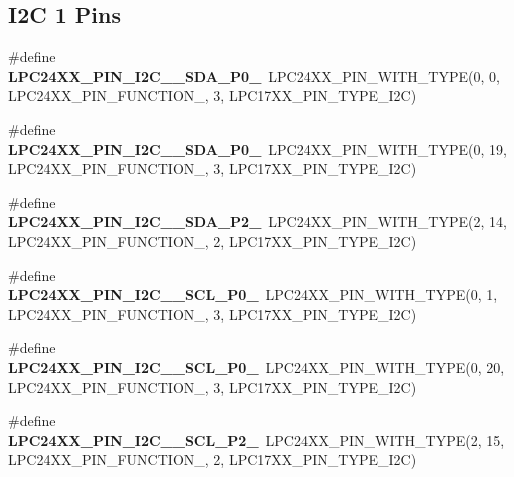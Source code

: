 \subsection*{I2C 1 Pins}
\begin{DoxyCompactItemize}
\item 
\mbox{\label{group__lpc24xx__io_ga3a047463a31dc3b28af1c553489df8ba}} 
\#define {\bfseries L\+P\+C24\+X\+X\+\_\+\+P\+I\+N\+\_\+\+I2\+C\+\_\+\_\+\+S\+D\+A\+\_\+\+P0\+\_}~L\+P\+C24\+X\+X\+\_\+\+P\+I\+N\+\_\+\+W\+I\+T\+H\+\_\+\+T\+Y\+PE(0, 0, L\+P\+C24\+X\+X\+\_\+\+P\+I\+N\+\_\+\+F\+U\+N\+C\+T\+I\+O\+N\+\_, 3, L\+P\+C17\+X\+X\+\_\+\+P\+I\+N\+\_\+\+T\+Y\+P\+E\+\_\+\+I2C)
\item 
\mbox{\label{group__lpc24xx__io_ga5ffb0adee0da470fdbfcc0ff00e24a79}} 
\#define {\bfseries L\+P\+C24\+X\+X\+\_\+\+P\+I\+N\+\_\+\+I2\+C\+\_\+\_\+\+S\+D\+A\+\_\+\+P0\+\_}~L\+P\+C24\+X\+X\+\_\+\+P\+I\+N\+\_\+\+W\+I\+T\+H\+\_\+\+T\+Y\+PE(0, 19, L\+P\+C24\+X\+X\+\_\+\+P\+I\+N\+\_\+\+F\+U\+N\+C\+T\+I\+O\+N\+\_, 3, L\+P\+C17\+X\+X\+\_\+\+P\+I\+N\+\_\+\+T\+Y\+P\+E\+\_\+\+I2C)
\item 
\mbox{\label{group__lpc24xx__io_ga846f53f4234a4803f3daeb663ca194c6}} 
\#define {\bfseries L\+P\+C24\+X\+X\+\_\+\+P\+I\+N\+\_\+\+I2\+C\+\_\+\_\+\+S\+D\+A\+\_\+\+P2\+\_}~L\+P\+C24\+X\+X\+\_\+\+P\+I\+N\+\_\+\+W\+I\+T\+H\+\_\+\+T\+Y\+PE(2, 14, L\+P\+C24\+X\+X\+\_\+\+P\+I\+N\+\_\+\+F\+U\+N\+C\+T\+I\+O\+N\+\_, 2, L\+P\+C17\+X\+X\+\_\+\+P\+I\+N\+\_\+\+T\+Y\+P\+E\+\_\+\+I2C)
\item 
\mbox{\label{group__lpc24xx__io_ga1e5603d4ec0e2b0415b71dcb62b42e23}} 
\#define {\bfseries L\+P\+C24\+X\+X\+\_\+\+P\+I\+N\+\_\+\+I2\+C\+\_\+\_\+\+S\+C\+L\+\_\+\+P0\+\_}~L\+P\+C24\+X\+X\+\_\+\+P\+I\+N\+\_\+\+W\+I\+T\+H\+\_\+\+T\+Y\+PE(0, 1, L\+P\+C24\+X\+X\+\_\+\+P\+I\+N\+\_\+\+F\+U\+N\+C\+T\+I\+O\+N\+\_, 3, L\+P\+C17\+X\+X\+\_\+\+P\+I\+N\+\_\+\+T\+Y\+P\+E\+\_\+\+I2C)
\item 
\mbox{\label{group__lpc24xx__io_ga39bbd04bce48f75337e5fa0311eaf3eb}} 
\#define {\bfseries L\+P\+C24\+X\+X\+\_\+\+P\+I\+N\+\_\+\+I2\+C\+\_\+\_\+\+S\+C\+L\+\_\+\+P0\+\_}~L\+P\+C24\+X\+X\+\_\+\+P\+I\+N\+\_\+\+W\+I\+T\+H\+\_\+\+T\+Y\+PE(0, 20, L\+P\+C24\+X\+X\+\_\+\+P\+I\+N\+\_\+\+F\+U\+N\+C\+T\+I\+O\+N\+\_, 3, L\+P\+C17\+X\+X\+\_\+\+P\+I\+N\+\_\+\+T\+Y\+P\+E\+\_\+\+I2C)
\item 
\mbox{\label{group__lpc24xx__io_gab7280fd087ddc1430cc7cd87c6757d41}} 
\#define {\bfseries L\+P\+C24\+X\+X\+\_\+\+P\+I\+N\+\_\+\+I2\+C\+\_\+\_\+\+S\+C\+L\+\_\+\+P2\+\_}~L\+P\+C24\+X\+X\+\_\+\+P\+I\+N\+\_\+\+W\+I\+T\+H\+\_\+\+T\+Y\+PE(2, 15, L\+P\+C24\+X\+X\+\_\+\+P\+I\+N\+\_\+\+F\+U\+N\+C\+T\+I\+O\+N\+\_, 2, L\+P\+C17\+X\+X\+\_\+\+P\+I\+N\+\_\+\+T\+Y\+P\+E\+\_\+\+I2C)
\end{DoxyCompactItemize}

